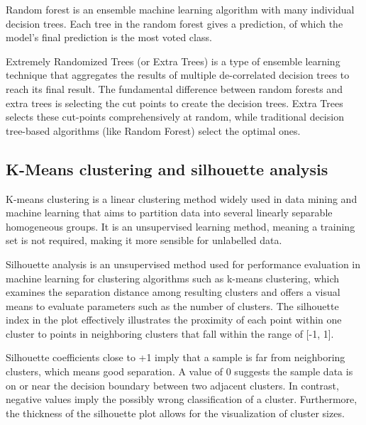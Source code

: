 Random forest \cite{598994} is an ensemble machine learning algorithm with many individual decision trees. Each tree in the random forest gives a prediction, of which the model's final prediction is the most voted class.

Extremely Randomized Trees (or Extra Trees) \cite{geurts2006extremely} is a type of ensemble learning technique that aggregates the results of multiple de-correlated decision trees to reach its final result. The fundamental difference between random forests and extra trees is selecting the cut points to create the decision trees. Extra Trees selects these cut-points comprehensively at random, while traditional decision tree-based algorithms (like Random Forest) select the optimal ones.

\subsection{K-Means clustering and silhouette analysis}
\label{subsec:silhouette}

K-means clustering \cite{Wu2012} is a linear clustering method widely used in data mining and machine learning that aims to partition data into several linearly separable homogeneous groups. It is an unsupervised learning method, meaning a training set is not required, making it more sensible for unlabelled data.

Silhouette analysis \cite{10.1007/978-3-319-62416-7_21} is an unsupervised method used for performance evaluation in machine learning for clustering algorithms such as k-means clustering, which examines the separation distance among resulting clusters and offers a visual means to evaluate parameters such as the number of clusters. The silhouette index in the plot effectively illustrates the proximity of each point within one cluster to points in neighboring clusters that fall within the range of [-1, 1].

Silhouette coefficients close to +1 imply that a sample is far from neighboring clusters, which means good separation. A value of 0 suggests the sample data is on or near the decision boundary between two adjacent clusters. In contrast, negative values imply the possibly wrong classification of a cluster. Furthermore, the thickness of the silhouette plot allows for the visualization of cluster sizes.


